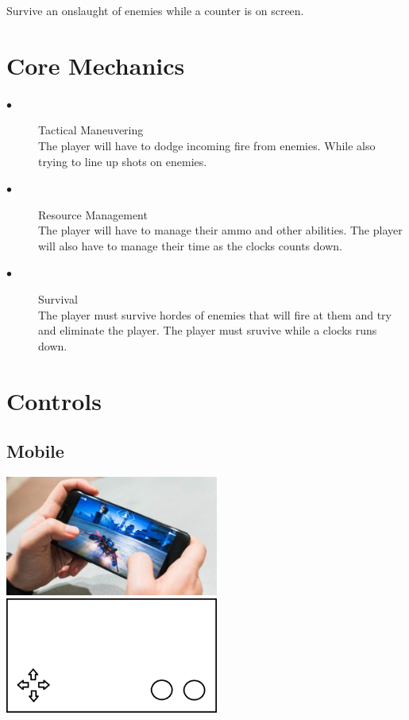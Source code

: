 \documentclass[a4paper]{scrreprt}
\begin{document}
Survive an onslaught of enemies while a counter is on screen.

\section{Core Mechanics}

\begin{description}
\item[$\bullet$] Tactical Maneuvering \\
The player will have to dodge incoming fire from enemies. While also trying to line up shots on enemies.
\item[$\bullet$] Resource Management \\
The player will have to manage their ammo and other abilities. The player will also have to manage their time as the clocks counts down.
\item[$\bullet$] Survival \\
The player must survive hordes of enemies that will fire at them and try and eliminate the player. The player must sruvive while a clocks runs down.
\end{description}

\section{Controls}

\subsection{Mobile}

\begin{center}
\includegraphics[width=7cm]{mobile}
\includegraphics[width=7cm]{mobile-controls}
\end{center}
\end{document}
